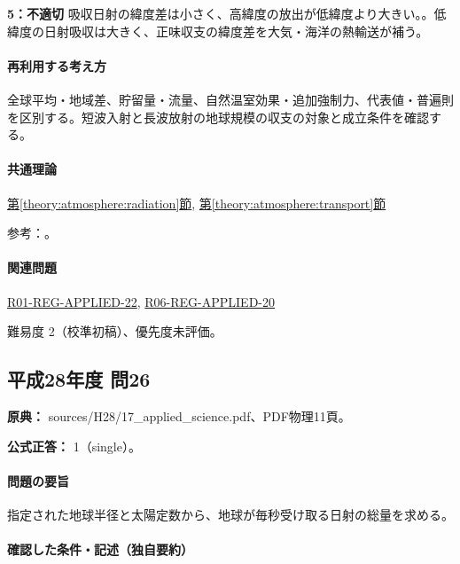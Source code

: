 \noindent\textbf{5：不適切} 吸収日射の緯度差は小さく、高緯度の放出が低緯度より大きい。。低緯度の日射吸収は大きく、正味収支の緯度差を大気・海洋の熱輸送が補う。\par

\paragraph{再利用する考え方} 全球平均・地域差、貯留量・流量、自然温室効果・追加強制力、代表値・普遍則を区別する。短波入射と長波放射の地球規模の収支の対象と成立条件を確認する。

\paragraph{共通理論} \hyperref[theory:atmosphere:radiation]{第\ref*{theory:atmosphere:radiation}節}, \hyperref[theory:atmosphere:transport]{第\ref*{theory:atmosphere:transport}節}

\par 参考：\cite{atm_nasa_budget,atm_nasa_albedo,atm_nasa_transport}。

\paragraph{関連問題} \hyperref[q:r01-reg-applied-22]{R01-REG-APPLIED-22}, \hyperref[q:r06-reg-applied-20]{R06-REG-APPLIED-20}

\par 難易度 2（校準初稿）、優先度未評価。

\subsection{平成28年度 問26}
\label{q:h28-reg-applied-26}

\noindent\textbf{原典：} sources/H28/17\_applied\_science.pdf、PDF物理11頁。

\textbf{公式正答：} 1（single）。

\paragraph{問題の要旨} 指定された地球半径と太陽定数から、地球が毎秒受け取る日射の総量を求める。

\paragraph{確認した条件・記述（独自要約）}\mbox{}\par

